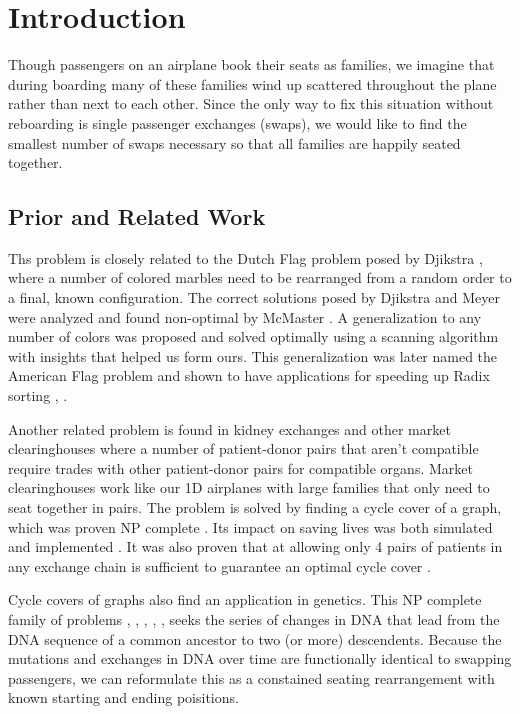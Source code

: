 \section{Introduction}
Though passengers on an airplane book their seats as families, we imagine that during boarding many of these families wind up scattered throughout the plane rather than next to each other.  Since the only way to fix this situation without reboarding is single passenger exchanges (swaps), we would like to find the smallest number of swaps necessary so that all families are happily seated together.

\subsection{Prior and Related Work}

Ths problem is closely related to the Dutch Flag problem posed by Djikstra \cite{dijkstra1976discipline}, where a number of colored marbles need to be rearranged from a random order to a final, known configuration.  The correct solutions posed by Djikstra and Meyer were analyzed and found non-optimal by McMaster \cite{mcMaster1978analysis}.  A generalization to any number of colors was proposed and solved optimally \cite{bitner1982asymptotically} using a scanning algorithm with insights that helped us form ours.  This generalization was later named the American Flag problem and shown to have applications for speeding up Radix sorting \cite{mcllroy1993engineering}, \cite{al2005formulation}.

Another related problem is found in kidney exchanges and other market clearinghouses where a number of patient-donor pairs that aren't compatible require trades with other patient-donor pairs for compatible organs.  Market clearinghouses work like our 1D airplanes with large families that only need to seat together in pairs.  The problem is solved by finding a cycle cover of a graph, which was proven NP complete \cite{abraham2007clearing}.  Its impact on saving lives was both simulated \cite{roth2004kidney} and implemented \cite{abraham2007clearing}.  It was also proven that at allowing only 4 pairs of patients in any exchange chain is sufficient to guarantee an optimal cycle cover \cite{roth2007efficient}.

Cycle covers of graphs also find an application in genetics.  This NP complete family of problems \cite{bryant1998complexity}, \cite{durrett2005genomic}, \cite{goldberg2001complexity}, \cite{caprara1999formulations}, \cite{sankoff1997median}, \cite{popov2007multiple} seeks the series of changes in DNA that lead from the DNA sequence of a common ancestor to two (or more) descendents.  Because the mutations and exchanges in DNA over time are functionally identical to swapping passengers, we can reformulate this as a constained seating rearrangement with known starting and ending poisitions.

